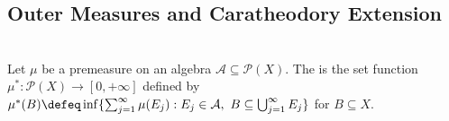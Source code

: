 \subsection{Outer Measures and Caratheodory Extension}

\begin{definition} \label{def:outer-measure-generated-by-premeasure} \\
Let $\mu$ be a premeasure on an algebra $\mathcal{A}\subseteq\mathcal{P}(X)$. The  is the set function $\mu^\ast:\mathcal{P}(X)\to[0,+\infty]$ defined by $\mu^\ast(B)\defeq\inf\{\sum_{j=1}^{\infty}\mu(E_j):E_j\in\mathcal{A},\ B\subseteq\bigcup_{j=1}^{\infty}E_j\}$ for $B\subseteq X$.
\end{definition}

